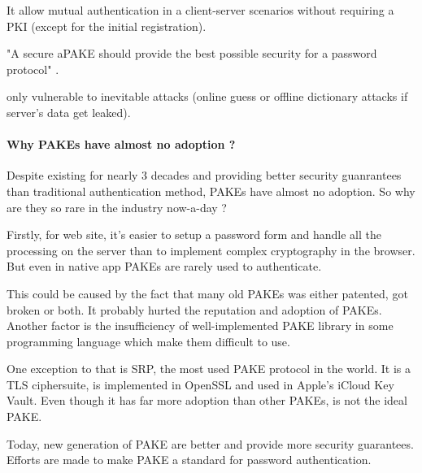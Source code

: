 \documentclass[../report.tex]{subfiles}
\begin{document}
It allow mutual authentication in a client-server scenarios without requiring a PKI (except for the initial registration).

"A secure aPAKE should provide the best possible security for a password protocol" \cite{OPAQUE_Standard_Draft}.

only vulnerable to inevitable attacks (online guess or offline dictionary attacks if server's data get leaked).

\paragraph{Why PAKEs have almost no adoption ?}






Despite existing for nearly 3 decades and providing better security guanrantees than traditional authentication method, PAKEs have almost no adoption. So why are they so rare in the industry now-a-day ?

Firstly, for web site, it's easier to setup a password form and handle all the processing on the server than to implement complex cryptography in the browser. But even in native app PAKEs are rarely used to authenticate.

This could be caused by the fact that many old PAKEs was either patented, got broken or both. %
It probably hurted the reputation and adoption of PAKEs.
Another factor is the insufficiency of well-implemented PAKE library in some programming language %
which make them difficult to use.

One exception to that is SRP, the most used PAKE protocol in the world. %
 It is a TLS ciphersuite, is implemented in OpenSSL and used in Apple's iCloud Key Vault. Even though it has far more adoption than other PAKEs, is not the ideal PAKE.


Today, new generation of PAKE are better and provide more security guarantees. Efforts are made to make PAKE a standard for password authentication. %



\end{document}
